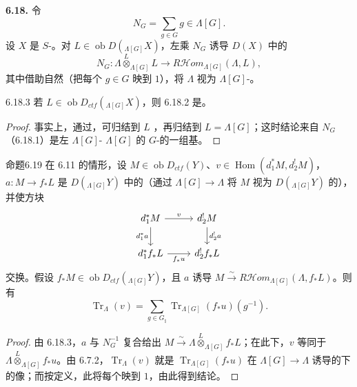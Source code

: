 \textbf{6.18.} 令
\begin{equation}N_G=\sum_{g\in G}g\in\Lambda[G].\tag{6.18.1}\end{equation}
设 $X$ 是 $S$-。对 $L\in\operatorname{ob}D({}_{\Lambda[G]}X)$，左乘 $N_G$ 诱导 $D(X)$ 中的
\begin{equation}N_G:\Lambda\overset L\otimes_{\Lambda[G]}L\longrightarrow R\mathcal H\!om_{\Lambda[G]}(\Lambda,L),\tag{6.18.2}\end{equation}
其中借助自然（把每个 $g\in G$ 映到 $1$），将 $\Lambda$ 视为 $\Lambda[G]$-。
\begin{SGAresult}{}{6.18.3}
若 $L\in\operatorname{ob}D_{ctf}({}_{\Lambda[G]}X)$，则 6.18.2 是。
\end{SGAresult}
\begin{proof}事实上，通过，可归结到 $L$ ，再归结到 $L=\Lambda[G]$；这时结论来自 $N_G$（6.18.1）是左 $\Lambda[G]$- $\Lambda[G]$ 的 $G$-的一组基。\end{proof}

\begin{SGAresult}{命题}{6.19}
在 6.11 的情形，设 $M\in\operatorname{ob}D_{ctf}(Y)$、$v\in\operatorname{Hom}(d_1^*M,d_2^!M)$，$a:M\to f_*L$ 是 $D({}_{\Lambda[G]}Y)$ 中的（通过 $\Lambda[G]\to\Lambda$ 将 $M$ 视为 $D({}_{\Lambda[G]}Y)$ 的），并使方块
\[\begin{tikzcd}d_1^*M\arrow[r,"v"]\arrow[d,"d_1^*a"']&d_2^!M\arrow[d,"d_2^!a"]\\d_1^*f_*L\arrow[r,"f_*u"']&d_2^!f_*L\end{tikzcd}\]
交换。假设 $f_*M\in\operatorname{ob}D_{ctf}({}_{\Lambda[G]}Y)$，且 $a$ 诱导 $M\xrightarrow\sim R\mathcal H\!om_{\Lambda[G]}(\Lambda,f_*L)$。则有
\begin{equation}\operatorname{Tr}_\Lambda(v)=\sum_{g\in G_\natural}\operatorname{Tr}_{\Lambda[G]}(f_*u)(g^{-1}).\tag{6.19.1}\end{equation}
\end{SGAresult}
\begin{proof}由 6.18.3，$a$ 与 $N_G^{-1}$ 复合给出 $M\xrightarrow\sim\Lambda\overset L\otimes_{\Lambda[G]}f_*L$；在此下，$v$ 等同于 $\Lambda\overset L\otimes_{\Lambda[G]}f_*u$。由 6.7.2，$\operatorname{Tr}_\Lambda(v)$ 就是 $\operatorname{Tr}_{\Lambda[G]}(f_*u)$ 在 $\Lambda[G]\to\Lambda$ 诱导的下的像；而按定义，此将每个映到 $1$，由此得到结论。\end{proof}

